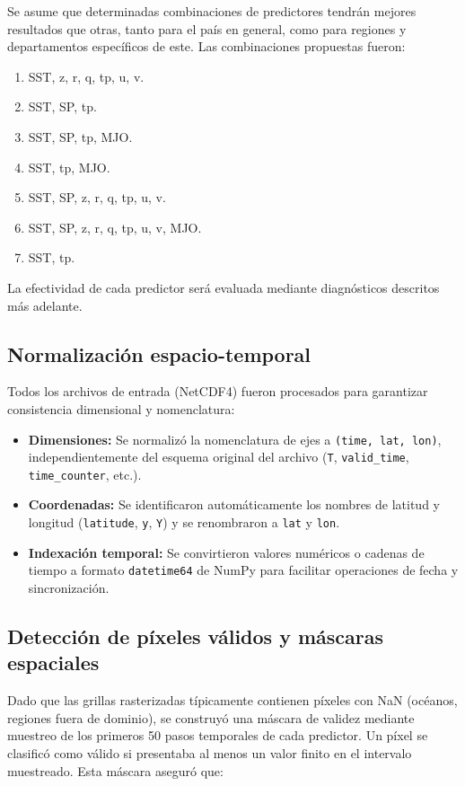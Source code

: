 Se asume que determinadas combinaciones de predictores tendrán mejores resultados que otras, tanto para el país en general, como para regiones y departamentos específicos de este. Las combinaciones propuestas fueron:
\begin{enumerate}
    \item SST, z, r, q, tp, u, v.
    \item SST, SP, tp.
    \item SST, SP, tp, MJO.
    \item SST, tp, MJO. 
    \item SST, SP, z, r, q, tp, u, v.
    \item SST, SP, z, r, q, tp, u, v, MJO.
    \item SST, tp.
\end{enumerate}

La efectividad de cada predictor será evaluada mediante diagnósticos descritos más adelante.

\subsection{Normalización espacio-temporal}
Todos los archivos de entrada (NetCDF4) fueron procesados para garantizar consistencia dimensional y nomenclatura:

\begin{itemize}
    \item \textbf{Dimensiones:} Se normalizó la nomenclatura de ejes a \texttt{(time, lat, lon)}, independientemente del esquema original del archivo (\texttt{T}, \texttt{valid\_time}, \texttt{time\_counter}, etc.).
    \item \textbf{Coordenadas:} Se identificaron automáticamente los nombres de latitud y longitud (\texttt{latitude}, \texttt{y}, \texttt{Y}) y se renombraron a \texttt{lat} y \texttt{lon}.
    \item \textbf{Indexación temporal:} Se convirtieron valores numéricos o cadenas de tiempo a formato \texttt{datetime64} de NumPy para facilitar operaciones de fecha y sincronización.
\end{itemize}

\subsection{Detección de píxeles válidos y máscaras espaciales}
Dado que las grillas rasterizadas típicamente contienen píxeles con NaN (océanos, regiones fuera de dominio), se construyó una máscara de validez mediante muestreo de los primeros 50 pasos temporales de cada predictor. Un píxel se clasificó como válido si presentaba al menos un valor finito en el intervalo muestreado. Esta máscara aseguró que:

